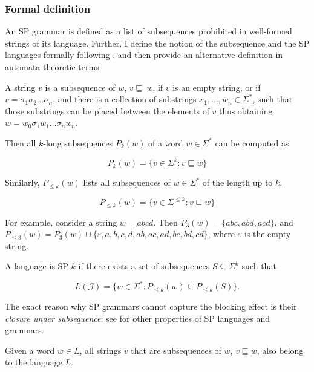 \subsubsection{Formal definition}
\label{SPformaldef}

An SP grammar is defined as a list of subsequences prohibited in well-formed strings of its language.
Further, I define the notion of the subsequence and the SP languages formally following \cite{Rogers-HeinzEtAl-2010-LPTSS}, and then provide an alternative definition in automata-theoretic terms.



\begin{definition}
A string $v$ is a subsequence of $w$, $v \sqsubseteq~ w$, if $v$ is an empty string, or if $v = \sigma_1\sigma_2\dots\sigma_n$, and there is a collection of substrings $x_1, \dots, w_n \in \Sigma^*$, such that those substrings can be placed between the elements of $v$ thus obtaining $w = w_0\sigma_1 w_1\dots\sigma_n w_n$.

Then all $k$-long subsequences $P_k(w)$ of a word $w \in \Sigma^*$ can be computed as

$$ P_{k}(w) = \{v \in \Sigma^{k} : v \sqsubseteq w\} $$

Similarly, $P_{\leq k}(w)$ lists all subsequences of $w \in \Sigma^*$  of the length up to $k$.

$$ P_{\leq k}(w) = \{v \in \Sigma^{\leq k} : v \sqsubseteq w\} $$
\end{definition}



For example, consider a string $w = abcd$.
Then $P_{3}(w) = \{abc, abd, acd\}$, and $P_{\leq 3}(w) = P_{3}(w) \cup \{\varepsilon, a, b, c, d, ab, ac, ad, bc, bd, cd\}$, where $\varepsilon$ is the empty string.

\begin{definition}
A language is SP-$k$ if there exists a set of subsequences $S \subseteq \Sigma^k$ such that

\[
	L(\mathcal{G}) = \{w \in \Sigma^* : P_{\leq k}(w) \subseteq P_{\leq k}(S)\}.
\]
\end{definition}


The exact reason why SP grammars cannot capture the blocking effect is their \emph{closure under subsequence}; see \citep{Rogers-HeinzEtAl-2010-LPTSS} for other properties of SP languages and grammars.

\begin{definition}
Given a word $w \in L$, all strings $v$ that are subsequences of $w$, $v \sqsubseteq w$, also belong to the language $L$.
\end{definition}


